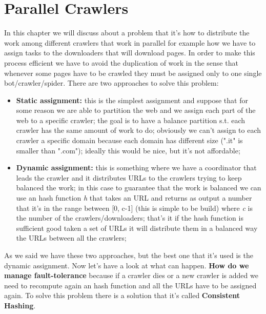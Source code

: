 \chapter{Parallel Crawlers}
In this chapter we will discuss about a problem that it's how to distribute the work among different crawlers that work in parallel for example how we have to assign tasks to the downloaders that will download pages.\newline
In order to make this process efficient we have to avoid the duplication of work in the sense that whenever some pages have to be crawled they must be assigned only to one single bot/crawler/spider.\newline
There are two approaches to solve this problem:
\begin{itemize}
    \item \textbf{Static assignment:} this is the simplest assignment and suppose that for some reason we are able to partition the web and we assign each part of the web to a specific crawler; the goal is to have a balance partition s.t. each crawler has the same amount of work to do; obviously we can't assign to each crawler a specific domain because each domain has different size (".it" is smaller than ".com"); ideally this would be nice, but it's not affordable;
    \item \textbf{Dynamic assignment:} this is something where we have a coordinator that leads the crawler and it distributes URLs to the crawlers trying to keep balanced the work; in this case to guarantee that the work is balanced we can use an hash function \textit{h} that takes an URL and returns as output a number that it's in the range between [0, c-1] (this is simple to be build) where \textit{c} is the number of the crawlers/downloaders; that's it if the hash function is sufficient good taken a set of URLs it will distribute them in a balanced way the URLs between all the crawlers;
\end{itemize}
As we said we have these two approaches, but the best one that it's used is the dynamic assignment. Now let's have a look at what can happen.\newline
\textbf{How do we manage fault-tolerance} because if a crawler dies or a new crawler is added we need to recompute again an hash function and all the URLs have to be assigned again. To solve this problem there is a solution that it's called \textbf{Consistent Hashing}.

